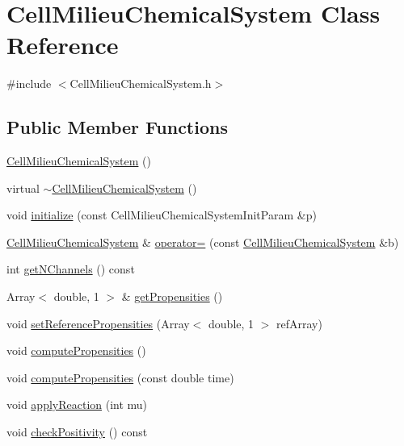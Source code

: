 \hypertarget{class_cell_milieu_chemical_system}{\section{\-Cell\-Milieu\-Chemical\-System \-Class \-Reference}
\label{class_cell_milieu_chemical_system}
}


{\ttfamily \#include $<$\-Cell\-Milieu\-Chemical\-System.\-h$>$}

\subsection*{\-Public \-Member \-Functions}
\begin{DoxyCompactItemize}
\item 
\hyperlink{class_cell_milieu_chemical_system_a20667ede1c1a03e7a6d04dd978f93e22}{\-Cell\-Milieu\-Chemical\-System} ()
\item 
virtual \hyperlink{class_cell_milieu_chemical_system_a0676c76da776a7ecd5dd3e704781f70e}{$\sim$\-Cell\-Milieu\-Chemical\-System} ()
\item 
void \hyperlink{class_cell_milieu_chemical_system_a3e57a149e8123c5288c89c07a4db2020}{initialize} (const \-Cell\-Milieu\-Chemical\-System\-Init\-Param \&p)
\item 
\hyperlink{class_cell_milieu_chemical_system}{\-Cell\-Milieu\-Chemical\-System} \& \hyperlink{class_cell_milieu_chemical_system_a45665aaee6778f80fa8e3ac79c506de7}{operator=} (const \hyperlink{class_cell_milieu_chemical_system}{\-Cell\-Milieu\-Chemical\-System} \&b)
\item 
int \hyperlink{class_cell_milieu_chemical_system_a9e907b6598deb45746f2b90bf159ea76}{get\-N\-Channels} () const 
\item 
\-Array$<$ double, 1 $>$ \& \hyperlink{class_cell_milieu_chemical_system_a2c423b1b87acb6e1b16ed126710a3208}{get\-Propensities} ()
\item 
void \hyperlink{class_cell_milieu_chemical_system_afdd69e7fcb9abc24f5348e1fb8c80bbd}{set\-Reference\-Propensities} (\-Array$<$ double, 1 $>$ ref\-Array)
\item 
void \hyperlink{class_cell_milieu_chemical_system_a32eded6123fa863a3a7a155a33a39ba1}{compute\-Propensities} ()
\item 
void \hyperlink{class_cell_milieu_chemical_system_ab272efa8d5aa1814094164fcee4279c1}{compute\-Propensities} (const double time)
\item 
void \hyperlink{class_cell_milieu_chemical_system_ae35e3b1da179628c159ee5776a8b3174}{apply\-Reaction} (int mu)
\item 
void \hyperlink{class_cell_milieu_chemical_system_a0c51c7c9aa3054ce99e4995f3c1c794b}{check\-Positivity} () const 
\end{DoxyCompactItemize}
